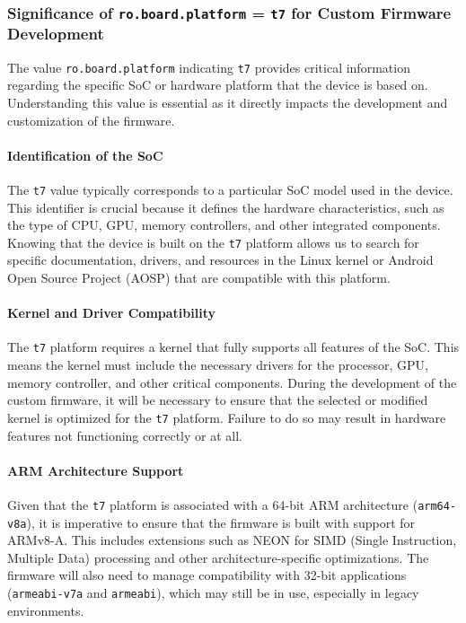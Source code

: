 

\subsubsection{Significance of \texttt{ro.board.platform} = \texttt{t7} for Custom Firmware Development}

The value \texttt{ro.board.platform} indicating \texttt{t7} provides critical information regarding the specific \gls{SoC} or hardware platform that the device is based on. Understanding this value is essential as it directly impacts the development and customization of the firmware.

\paragraph{Identification of the SoC}
The \texttt{t7} value typically corresponds to a particular \gls{SoC} model used in the device. This identifier is crucial because it defines the hardware characteristics, such as the type of CPU, GPU, memory controllers, and other integrated components. Knowing that the device is built on the \texttt{t7} platform allows us to search for specific documentation, drivers, and resources in the Linux kernel or Android Open Source Project (AOSP) that are compatible with this platform.

\paragraph{Kernel and Driver Compatibility}
The \texttt{t7} platform requires a kernel that fully supports all features of the \gls{SoC}. This means the kernel must include the necessary drivers for the processor, GPU, memory controller, and other critical components. During the development of the custom firmware, it will be necessary to ensure that the selected or modified kernel is optimized for the \texttt{t7} platform. Failure to do so may result in hardware features not functioning correctly or at all.

\paragraph{ARM Architecture Support}
Given that the \texttt{t7} platform is associated with a 64-bit ARM architecture (\texttt{arm64-v8a}), it is imperative to ensure that the firmware is built with support for ARMv8-A. This includes extensions such as NEON for SIMD (Single Instruction, Multiple Data) processing and other architecture-specific optimizations. The firmware will also need to manage compatibility with 32-bit applications (\texttt{armeabi-v7a} and \texttt{armeabi}), which may still be in use, especially in legacy environments.

